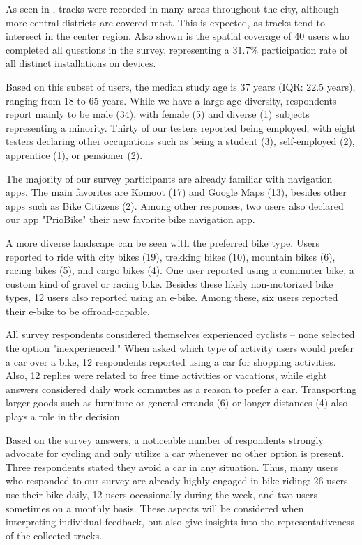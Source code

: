 As seen in , tracks were recorded in many areas throughout the city, although more central districts are covered most. This is expected, as tracks tend to intersect in the center region. Also shown is the spatial coverage of 40 users who completed all questions in the survey, representing a 31.7\% participation rate of all distinct installations on devices.

Based on this subset of users, the median study age is 37 years (IQR: 22.5 years), ranging from 18 to 65 years. While we have a large age diversity, respondents report mainly to be male (34), with female (5) and diverse (1) subjects representing a minority. Thirty of our testers reported being employed, with eight testers declaring other occupations such as being a student (3), self-employed (2), apprentice (1), or pensioner (2).

The majority of our survey participants are already familiar with navigation apps. The main favorites are Komoot (17) and Google Maps (13), besides other apps such as Bike Citizens (2). Among other responses, two users also declared our app "PrioBike" their new favorite bike navigation app. 

A more diverse landscape can be seen with the preferred bike type. Users reported to ride with city bikes (19), trekking bikes (10), mountain bikes (6), racing bikes (5), and cargo bikes (4). One user reported using a commuter bike, a custom kind of gravel or racing bike. Besides these likely non-motorized bike types, 12 users also reported using an e-bike. Among these, six users reported their e-bike to be offroad-capable. 

All survey respondents considered themselves experienced cyclists -- none selected the option "inexperienced." When asked which type of activity users would prefer a car over a bike, 12 respondents reported using a car for shopping activities. Also, 12 replies were related to free time activities or vacations, while eight answers considered daily work commutes as a reason to prefer a car. Transporting larger goods such as furniture or general errands (6) or longer distances (4) also plays a role in the decision. 

Based on the survey answers, a noticeable number of respondents strongly advocate for cycling and only utilize a car whenever no other option is present. Three respondents stated they avoid a car in any situation. Thus, many users who responded to our survey are already highly engaged in bike riding: 26 users use their bike daily, 12 users occasionally during the week, and two users sometimes on a monthly basis. These aspects will be considered when interpreting individual feedback, but also give insights into the representativeness of the collected tracks.

